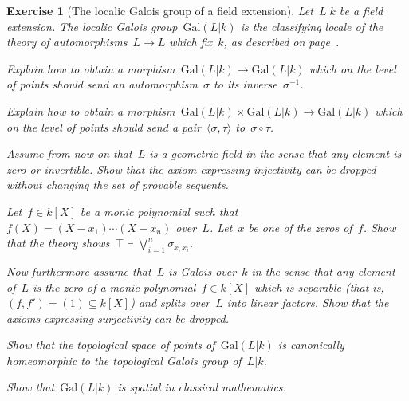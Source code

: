 \documentclass{ws-rv9x6}
\newtheorem{ex}{Exercise}
\newenvironment{exercise}[1]{
  \begin{ex}[#1]
}{\end{ex}}
\newcommand{\Gal}{\mathrm{Gal}}
\renewcommand{\_}{\mathpunct{.}}
\newcommand{\?}{\,{:}\,}
\begin{document}
\begin{exercise}{The localic Galois group of a field extension}%
Let~$L|k$ be a field extension. The \emph{localic Galois group}~$\Gal(L|k)$
is the classifying locale of the theory of automorphisms~$L \to L$ which
fix~$k$, as described on page~\pageref{par:theory-automorphisms}.
\begin{alphlist}[(g)]
\item Explain how to obtain a morphism~$\Gal(L|k) \to \Gal(L|k)$ which on the
level of points should send an automorphism~$\sigma$ to its inverse~$\sigma^{-1}$.
\item Explain how to obtain a morphism~$\Gal(L|k) \times \Gal(L|k) \to \Gal(L|k)$ which on the
level of points should send a pair~$\langle \sigma, \tau \rangle$ to~$\sigma \circ \tau$.
\item Assume from now on that~$L$ is a \emph{geometric field} in the sense that any
element is zero or invertible. Show that the axiom expressing injectivity can
be dropped without changing the set of provable sequents.
\item Let~$f \in k[X]$ be a monic polynomial such that~$f(X) =
(X-x_1)\cdots(X-x_n)$ over~$L$. Let~$x$ be one of the zeros of~$f$. Show that
the theory shows~$\top \vdash \bigvee_{i=1}^n \sigma_{x,x_i}$.
\item Now furthermore assume that~$L$ is \emph{Galois over}~$k$ in the sense that
any element of~$L$ is the zero of a monic polynomial~$f \in k[X]$ which is
separable (that is,~$(f,f') = (1) \subseteq k[X]$) and splits over~$L$ into
linear factors. Show that the axioms expressing surjectivity can be dropped.
\item Show that the topological space of points of~$\Gal(L|k)$ is canonically
homeomorphic to the topological Galois group of~$L|k$.
\item Show that~$\Gal(L|k)$ is spatial in classical mathematics.
\end{alphlist}
\end{exercise}
\end{document}

